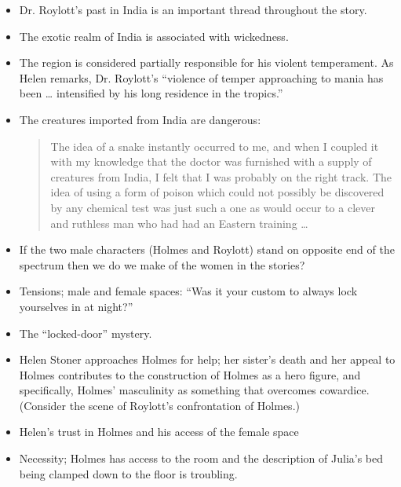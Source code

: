 \documentclass[a4paper,landscape,headrule,footrule,xetex]{foils}
\begin{document}
\begin{itemize}
\item Dr. Roylott’s past in India is an important thread throughout
  the story. 
\item The exotic realm of India is associated with wickedness. 
\item The region is
  considered partially responsible for his violent temperament.
 As Helen remarks, Dr. Roylott’s “violence of temper approaching to
 mania has been \ldots{} intensified by his long residence in the tropics.”
\item  The 
  creatures imported from India are dangerous:

  \begin{quote}
The idea of a snake instantly occurred to me, and when I coupled it
with my knowledge that the doctor was furnished with a supply of
creatures from India, I felt that I was probably on the right
track. The idea of using a form of poison which could not possibly be
discovered by any chemical test was just such a one as would occur to
a clever and ruthless man who had had an Eastern training \ldots{}  
\end{quote}

\end{itemize}
\begin{itemize}
  \item If the two male characters (Holmes and Roylott) stand on opposite end of the spectrum then we do we make of the women in the stories?      
  \item Tensions; male and female spaces: “Was it your custom to always lock yourselves in at night?”        
  \item The “locked-door” mystery.        
  \item Helen Stoner approaches Holmes for help; her sister’s death
    and her appeal to Holmes contributes to the construction of Holmes
    as a hero figure, and specifically, Holmes' masculinity as
    something that overcomes cowardice. 
    (Consider the scene of Roylott’s confrontation of Holmes.)      
  \item Helen’s trust in Holmes and his access of the female space
  \item Necessity; Holmes has access to the room and the description of Julia’s bed being clamped down to the floor is troubling.
  \end{itemize}
\end{document}
